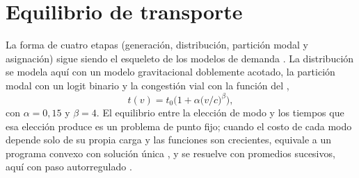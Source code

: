 \section{Equilibrio de transporte}

La forma de cuatro etapas (generación, distribución, partición modal y asignación) sigue siendo el
esqueleto de los modelos de demanda \citep{ortuzar2011}. La distribución se modela aquí con un modelo
gravitacional doblemente acotado, la partición modal con un logit binario y la congestión vial con la
función del \citet{bpr1964},
\begin{equation}\label{eq:bpr}
t(v)=t_0\Big(1+\alpha\big(v/c\big)^{\beta}\Big),
\end{equation}
con $\alpha=0{,}15$ y $\beta=4$. El equilibrio entre la elección de modo y los tiempos que esa elección
produce es un problema de punto fijo; cuando el costo de cada modo depende solo de su propia carga y las
funciones son crecientes, equivale a un programa convexo con solución única \citep{sheffi1985}, y se
resuelve con promedios sucesivos, aquí con paso autorregulado \citep{liu2009}.

